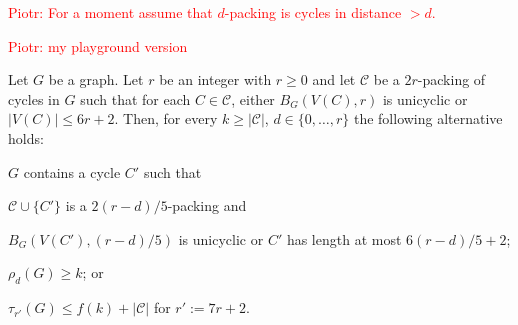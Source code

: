 \documentclass{patmorin}
\newcommand{\pat}[1]{\textcolor{Blue}{Pat: #1}}
\newcommand{\piotr}[1]{\textcolor{red}{Piotr: #1}}
\DeclareMathOperator{\dist}{dist}
\begin{document}








\piotr{For a moment assume that $d$-packing is cycles in distance $>d$.}

\piotr{my playground version}
\begin{lem}\label{a_or_b2}
  Let $G$ be a graph.
  Let $r$ be an integer with $r\geq0$ and
  let $\mathcal{C}$ be a $2r$-packing of cycles in $G$ such that
  for each $C\in\mathcal{C}$,
  either  $B_G(V(C),r)$ is unicyclic
  or $|V(C)|\le 6r+2$.
  Then, for every $k\ge |\mathcal{C}|$, $d\in\{0,\ldots,r\}$
  the following alternative holds:
  \begin{compactenum}[(a)]
    \item $G$ contains a cycle $C'$ such that
    \begin{compactenum}[(i)]
      \item $\mathcal{C}\cup\{C'\}$ is a $2(r-d)/5$-packing and
      \item $B_G(V(C'),(r-d)/5)$ is unicyclic or $C'$ has length at most $6(r-d)/5+2$;
    \end{compactenum}
    \item $\rho_d(G)\ge k$; or
    \item $\tau_{r'}(G) \le f(k)+ |\mathcal{C}|$ for $r':=7r+2$.
  \end{compactenum}
\end{lem}
\end{document}
